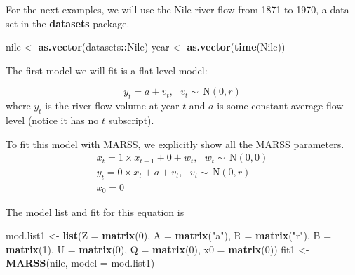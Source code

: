 \documentclass[12pt,]{book}
\newenvironment{Shaded}{\begin{snugshade}}{\end{snugshade}}
\newcommand{\DataTypeTok}[1]{\textcolor[rgb]{0.13,0.29,0.53}{#1}}
\newcommand{\DecValTok}[1]{\textcolor[rgb]{0.00,0.00,0.81}{#1}}
\newcommand{\KeywordTok}[1]{\textcolor[rgb]{0.13,0.29,0.53}{\textbf{#1}}}
\newcommand{\NormalTok}[1]{#1}
\newcommand{\OperatorTok}[1]{\textcolor[rgb]{0.81,0.36,0.00}{\textbf{#1}}}
\newcommand{\StringTok}[1]{\textcolor[rgb]{0.31,0.60,0.02}{#1}}
\begin{document}
For the next examples, we will use the Nile river flow from 1871 to 1970, a data set in the \textbf{datasets} package.

\begin{Shaded}
\begin{Highlighting}[]
\NormalTok{nile <-}\StringTok{ }\KeywordTok{as.vector}\NormalTok{(datasets}\OperatorTok{::}\NormalTok{Nile)}
\NormalTok{year <-}\StringTok{ }\KeywordTok{as.vector}\NormalTok{(}\KeywordTok{time}\NormalTok{(Nile))}
\end{Highlighting}
\end{Shaded}

The first model we will fit is a flat level model:

\begin{equation}
y_t = a+v_t, \text{ } v_t \sim \,\text{N}(0,r)    
\label{eq:short-flat-level}
\end{equation}
where \(y_t\) is the river flow volume at year \(t\) and \(a\) is some constant average flow level (notice it has no \(t\) subscript).

To fit this model with MARSS, we explicitly show all the MARSS parameters.
\begin{equation}
\begin{gathered}
x_t = 1 \times x_{t-1}+ 0 + w_t,    \text{ } w_t \sim \,\text{N}(0,0) \\
y_t = 0 \times x_t + a + v_t, \text{ } v_t \sim \,\text{N}(0,r)  \\
x_0 = 0 
 \end{gathered}   
\label{eq:short-flat-level-model1}
\end{equation}

The model list and fit for this equation is

\begin{Shaded}
\begin{Highlighting}[]
\NormalTok{mod.list1 <-}\StringTok{ }\KeywordTok{list}\NormalTok{(}\DataTypeTok{Z =} \KeywordTok{matrix}\NormalTok{(}\DecValTok{0}\NormalTok{), }\DataTypeTok{A =} \KeywordTok{matrix}\NormalTok{(}\StringTok{"a"}\NormalTok{), }\DataTypeTok{R =} \KeywordTok{matrix}\NormalTok{(}\StringTok{"r"}\NormalTok{), }
    \DataTypeTok{B =} \KeywordTok{matrix}\NormalTok{(}\DecValTok{1}\NormalTok{), }\DataTypeTok{U =} \KeywordTok{matrix}\NormalTok{(}\DecValTok{0}\NormalTok{), }\DataTypeTok{Q =} \KeywordTok{matrix}\NormalTok{(}\DecValTok{0}\NormalTok{), }\DataTypeTok{x0 =} \KeywordTok{matrix}\NormalTok{(}\DecValTok{0}\NormalTok{))}
\NormalTok{fit1 <-}\StringTok{ }\KeywordTok{MARSS}\NormalTok{(nile, }\DataTypeTok{model =}\NormalTok{ mod.list1)}
\end{Highlighting}
\end{Shaded}
\end{document}
